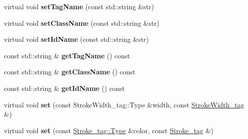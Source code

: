 \begin{DoxyCompactItemize}
\item 
\hypertarget{classsambag_1_1disco_1_1svg_1_1_svg_object_ad8c577fd3f4636001833f7400746413c}{
virtual void {\bfseries setTagName} (const std::string \&str)}
\label{classsambag_1_1disco_1_1svg_1_1_svg_object_ad8c577fd3f4636001833f7400746413c}

\item 
\hypertarget{classsambag_1_1disco_1_1svg_1_1_svg_object_aada81ea231142b5bf88e5247905a3d35}{
virtual void {\bfseries setClassName} (const std::string \&str)}
\label{classsambag_1_1disco_1_1svg_1_1_svg_object_aada81ea231142b5bf88e5247905a3d35}

\item 
\hypertarget{classsambag_1_1disco_1_1svg_1_1_svg_object_a7f4902ea2de8fa403c489257e9fcc6fa}{
virtual void {\bfseries setIdName} (const std::string \&str)}
\label{classsambag_1_1disco_1_1svg_1_1_svg_object_a7f4902ea2de8fa403c489257e9fcc6fa}

\item 
\hypertarget{classsambag_1_1disco_1_1svg_1_1_svg_object_acb5796cc159fb006ad31c4aa5c2612e5}{
const std::string \& {\bfseries getTagName} () const }
\label{classsambag_1_1disco_1_1svg_1_1_svg_object_acb5796cc159fb006ad31c4aa5c2612e5}

\item 
\hypertarget{classsambag_1_1disco_1_1svg_1_1_svg_object_aa406cbe116670451c6d6188eeca6b912}{
const std::string \& {\bfseries getClassName} () const }
\label{classsambag_1_1disco_1_1svg_1_1_svg_object_aa406cbe116670451c6d6188eeca6b912}

\item 
\hypertarget{classsambag_1_1disco_1_1svg_1_1_svg_object_afa955471a374c2a5239f6377ad047518}{
const std::string \& {\bfseries getIdName} () const }
\label{classsambag_1_1disco_1_1svg_1_1_svg_object_afa955471a374c2a5239f6377ad047518}

\item 
\hypertarget{classsambag_1_1disco_1_1svg_1_1_svg_object_abee1cd5d8cfcb9d7846aad0b5fca7384}{
virtual void {\bfseries set} (const StrokeWidth\_\-tag::Type \&width, const \hyperlink{structsambag_1_1disco_1_1svg_1_1_svg_object_1_1_stroke_width__tag}{StrokeWidth\_\-tag} \&)}
\label{classsambag_1_1disco_1_1svg_1_1_svg_object_abee1cd5d8cfcb9d7846aad0b5fca7384}

\item 
\hypertarget{classsambag_1_1disco_1_1svg_1_1_svg_object_aab0b180e22a531e6a125753c82eebd4f}{
virtual void {\bfseries set} (const \hyperlink{structsambag_1_1com_1_1_color_r_g_b_a}{Stroke\_\-tag::Type} \&color, const \hyperlink{structsambag_1_1disco_1_1svg_1_1_svg_object_1_1_stroke__tag}{Stroke\_\-tag} \&)}
\label{classsambag_1_1disco_1_1svg_1_1_svg_object_aab0b180e22a531e6a125753c82eebd4f}


\end{DoxyCompactItemize}
